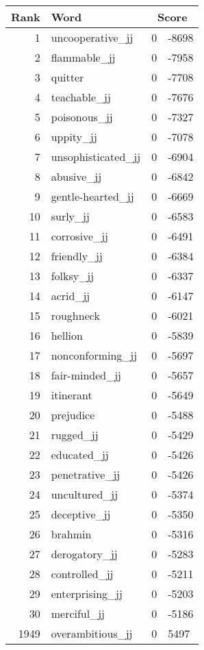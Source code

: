 \begin{longtable}[!htbp]{| rlr@{.}l |}
    \hline
    \textbf{Rank} & \textbf{Word} & \multicolumn{2}{c|}{\textbf{Score}} \\
    \hline
    \endhead
    1 & uncooperative\_jj & 0 & -8698 \\
    2 & flammable\_jj & 0 & -7958 \\
    3 & quitter & 0 & -7708 \\
    4 & teachable\_jj & 0 & -7676 \\
    5 & poisonous\_jj & 0 & -7327 \\
    6 & uppity\_jj & 0 & -7078 \\
    7 & unsophisticated\_jj & 0 & -6904 \\
    8 & abusive\_jj & 0 & -6842 \\
    9 & gentle-hearted\_jj & 0 & -6669 \\
    10 & surly\_jj & 0 & -6583 \\
    11 & corrosive\_jj & 0 & -6491 \\
    12 & friendly\_jj & 0 & -6384 \\
    13 & folksy\_jj & 0 & -6337 \\
    14 & acrid\_jj & 0 & -6147 \\
    15 & roughneck & 0 & -6021 \\
    16 & hellion & 0 & -5839 \\
    17 & nonconforming\_jj & 0 & -5697 \\
    18 & fair-minded\_jj & 0 & -5657 \\
    19 & itinerant & 0 & -5649 \\
    20 & prejudice & 0 & -5488 \\
    21 & rugged\_jj & 0 & -5429 \\
    22 & educated\_jj & 0 & -5426 \\
    23 & penetrative\_jj & 0 & -5426 \\
    24 & uncultured\_jj & 0 & -5374 \\
    25 & deceptive\_jj & 0 & -5350 \\
    26 & brahmin & 0 & -5316 \\
    27 & derogatory\_jj & 0 & -5283 \\
    28 & controlled\_jj & 0 & -5211 \\
    29 & enterprising\_jj & 0 & -5203 \\
    30 & merciful\_jj & 0 & -5186 \\
    1949 & overambitious\_jj & 0 & 5497 \\

\end{longtable}
